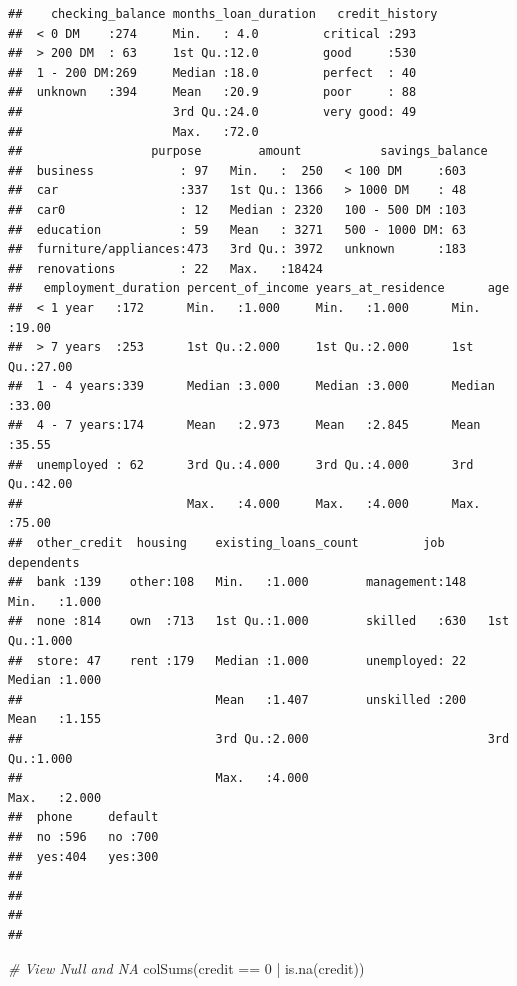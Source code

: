 \documentclass[]{article}
\newenvironment{Shaded}{\begin{snugshade}}{\end{snugshade}}
\newcommand{\CommentTok}[1]{\textcolor[rgb]{0.56,0.35,0.01}{\textit{#1}}}
\newcommand{\DecValTok}[1]{\textcolor[rgb]{0.00,0.00,0.81}{#1}}
\newcommand{\FunctionTok}[1]{\textcolor[rgb]{0.00,0.00,0.00}{#1}}
\newcommand{\NormalTok}[1]{#1}
\newcommand{\SpecialCharTok}[1]{\textcolor[rgb]{0.00,0.00,0.00}{#1}}
\begin{document}
\begin{verbatim}
##    checking_balance months_loan_duration   credit_history
##  < 0 DM    :274     Min.   : 4.0         critical :293   
##  > 200 DM  : 63     1st Qu.:12.0         good     :530   
##  1 - 200 DM:269     Median :18.0         perfect  : 40   
##  unknown   :394     Mean   :20.9         poor     : 88   
##                     3rd Qu.:24.0         very good: 49   
##                     Max.   :72.0                         
##                  purpose        amount           savings_balance
##  business            : 97   Min.   :  250   < 100 DM     :603   
##  car                 :337   1st Qu.: 1366   > 1000 DM    : 48   
##  car0                : 12   Median : 2320   100 - 500 DM :103   
##  education           : 59   Mean   : 3271   500 - 1000 DM: 63   
##  furniture/appliances:473   3rd Qu.: 3972   unknown      :183   
##  renovations         : 22   Max.   :18424                       
##   employment_duration percent_of_income years_at_residence      age       
##  < 1 year   :172      Min.   :1.000     Min.   :1.000      Min.   :19.00  
##  > 7 years  :253      1st Qu.:2.000     1st Qu.:2.000      1st Qu.:27.00  
##  1 - 4 years:339      Median :3.000     Median :3.000      Median :33.00  
##  4 - 7 years:174      Mean   :2.973     Mean   :2.845      Mean   :35.55  
##  unemployed : 62      3rd Qu.:4.000     3rd Qu.:4.000      3rd Qu.:42.00  
##                       Max.   :4.000     Max.   :4.000      Max.   :75.00  
##  other_credit  housing    existing_loans_count         job        dependents   
##  bank :139    other:108   Min.   :1.000        management:148   Min.   :1.000  
##  none :814    own  :713   1st Qu.:1.000        skilled   :630   1st Qu.:1.000  
##  store: 47    rent :179   Median :1.000        unemployed: 22   Median :1.000  
##                           Mean   :1.407        unskilled :200   Mean   :1.155  
##                           3rd Qu.:2.000                         3rd Qu.:1.000  
##                           Max.   :4.000                         Max.   :2.000  
##  phone     default  
##  no :596   no :700  
##  yes:404   yes:300  
##                     
##                     
##                     
## 
\end{verbatim}

\begin{Shaded}
\begin{Highlighting}[]
\CommentTok{\# View Null and NA}
\FunctionTok{colSums}\NormalTok{(credit }\SpecialCharTok{==} \DecValTok{0} \SpecialCharTok{|} \FunctionTok{is.na}\NormalTok{(credit))}
\end{Highlighting}
\end{Shaded}
\end{document}
